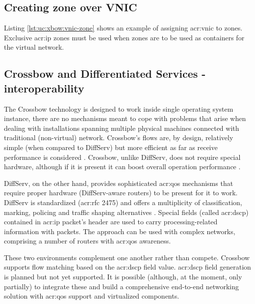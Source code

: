 \documentclass[11pt,openany]{book}
\begin{document}
      \subsection{Creating zone over VNIC}

        Listing \ref{lst:uc:xbow:vnic-zone} shows an example of assigning \gls{acr:vnic} to zones. Exclusive
        \gls{acr:ip} zones must be used when zones are to be used as containers for the virtual network. \\

        \noindent
        \begin{minipage}{\textwidth}
          
        \end{minipage}


      \subsection{Crossbow and Differentiated Services - interoperability}
      \label{sub:sol:diffserv}

        The Crossbow technology is designed to work inside single operating system instance, there are no mechanisms
        meant to cope with problems that arise when dealing with installations spanning multiple physical machines
        connected with traditional (non-virtual) network. Crossbow's flows are, by design, relatively simple (when
        compared to DiffServ) but more efficient as far as receive performance is considered \cite{xbow-vertically}.
        Crossbow, unlike DiffServ, does not require special hardware, although if it is present it can boost overall
        operation performance \cite{xbow-vertically}.

        DiffServ, on the other hand, provides sophisticated \gls{acr:qos} mechanisms that require proper hardware
        (DiffServ-aware routers) to be present for it to work. DiffServ is standardized (\gls{acr:rfc} 2475) and offers
        a multiplicity of classification, marking, policing and traffic shaping alternatives \cite{rfc2475}. Special
        fields (called \gls{acr:dscp}) contained in \gls{acr:ip} packet's header are used to carry processing-related
        information with packets. The approach can be used with complex networks, comprising a number of routers with
        \gls{acr:qos} awareness.

        These two environments complement one another rather than compete. Crossbow supports flow matching based on the
        \gls{acr:dscp} field value. \gls{acr:dscp} field generation is planned but not yet supported. It is possible
        (although, at the moment, only partially) to integrate these and build a comprehensive end-to-end networking
        solution with \gls{acr:qos} support and virtualized components.
\end{document}
